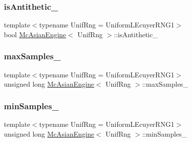 \subsubsection{\texorpdfstring{is\+Antithetic\+\_\+}{isAntithetic\_}}
{\footnotesize\ttfamily template$<$typename Unif\+Rng  = Uniform\+L\+Ecuyer\+R\+N\+G1$>$ \\
bool \hyperlink{class_mc_asian_engine}{Mc\+Asian\+Engine}$<$ Unif\+Rng $>$\+::is\+Antithetic\+\_\+\hspace{0.3cm}{\ttfamily [private]}}

\hypertarget{class_mc_asian_engine_afef8e1a62d6d3e865a511f9b24bc16fe}{}\label{class_mc_asian_engine_afef8e1a62d6d3e865a511f9b24bc16fe} 
\subsubsection{\texorpdfstring{max\+Samples\+\_\+}{maxSamples\_}}
{\footnotesize\ttfamily template$<$typename Unif\+Rng  = Uniform\+L\+Ecuyer\+R\+N\+G1$>$ \\
unsigned long \hyperlink{class_mc_asian_engine}{Mc\+Asian\+Engine}$<$ Unif\+Rng $>$\+::max\+Samples\+\_\+\hspace{0.3cm}{\ttfamily [private]}}

\hypertarget{class_mc_asian_engine_ad310118988d49cf73b5515ee6af85996}{}\label{class_mc_asian_engine_ad310118988d49cf73b5515ee6af85996} 
\subsubsection{\texorpdfstring{min\+Samples\+\_\+}{minSamples\_}}
{\footnotesize\ttfamily template$<$typename Unif\+Rng  = Uniform\+L\+Ecuyer\+R\+N\+G1$>$ \\
unsigned long \hyperlink{class_mc_asian_engine}{Mc\+Asian\+Engine}$<$ Unif\+Rng $>$\+::min\+Samples\+\_\+\hspace{0.3cm}{\ttfamily [private]}}

\hypertarget{class_mc_asian_engine_a3b8579245987fd1a2f98561fee7e7011}{}\label{class_mc_asian_engine_a3b8579245987fd1a2f98561fee7e7011} 
